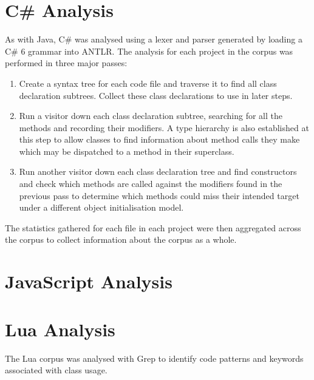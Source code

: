 \section{C\# Analysis}
As with Java, C\# was analysed using a lexer and parser generated by loading a C\# 6 grammar into ANTLR. The analysis for each project in the corpus was performed in three major passes:
\begin{enumerate}
	\item Create a syntax tree for each code file and traverse it to find all class declaration subtrees. Collect these class declarations to use in later steps.
	\item Run a visitor down each class declaration subtree, searching for all the methods and recording their modifiers. A type hierarchy is also established at this step to allow classes to find information about method calls they make which may be dispatched to a method in their superclass.
	\item Run another visitor down each class declaration tree and find constructors and check which methods are called against the modifiers found in the previous pass to determine which methods could miss their intended target under a different object initialisation model.
\end{enumerate}
The statistics gathered for each file in each project were then aggregated across the corpus to collect information about the corpus as a whole.

\section{JavaScript Analysis}

\section{Lua Analysis}
The Lua corpus was analysed with Grep to identify code patterns and keywords associated with class usage.






